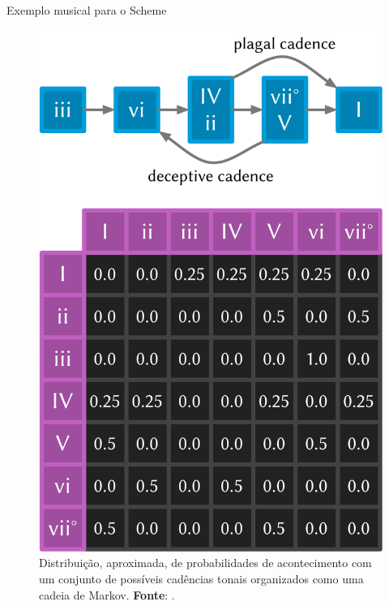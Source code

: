 \documentclass[aspectratio=169]{beamer}
\begin{document}
\begin{frame}{Exemplo musical para o Scheme}
\begin{figure}
  \centering
  \includegraphics[scale=0.225]{imagens/markov.png}
  \caption{Distribuição, aproximada, de probabilidades de acontecimento com um conjunto de possíveis cadências tonais organizados como uma cadeia de Markov. \textbf{Fonte}: .}
   \label{fig:markov}
\end{figure}
\end{frame}


\end{document}
